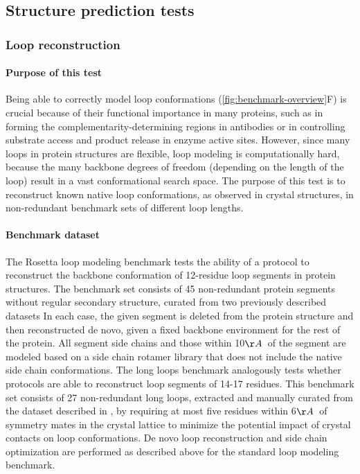 \subsection{Structure prediction tests}

\subsubsection{Loop reconstruction}

\paragraph{Purpose of this test}
Being able to correctly model loop conformations (\cref{fig:benchmark-overview}F) is crucial because of their functional importance in many proteins, such as in forming the complementarity-determining regions in antibodies or in controlling substrate access and product release in enzyme active sites. However, since many loops in protein structures are flexible, loop modeling is computationally hard, because the many backbone degrees of freedom (depending on the length of the loop) result in a vast conformational search space. The purpose of this test is to reconstruct known native loop conformations, as observed in crystal structures, in non-redundant benchmark sets of different loop lengths.

\paragraph{Benchmark dataset}
The Rosetta loop modeling benchmark \cite{mandell_sub-angstrom_2009,tonikian_specificity_2008,ernst_rapid_2009,smith_predicting_2011,smith_structure-based_2010,stein_improvements_2013} tests the ability of a protocol to reconstruct the backbone conformation of 12-residue loop segments in protein structures. The benchmark set consists of 45 non-redundant protein segments without regular secondary structure, curated from two previously described datasets \cite{sellers_toward_2008,wang_proteinprotein_2007,fiser_modeling_2000,rohl_modeling_2004,zhu_long_2006,jacobson_hierarchical_2004}
In each case, the given segment is deleted from the protein structure and then reconstructed de novo, given a fixed backbone environment for the rest of the protein. All segment side chains and those within 10$\AA$\ of the segment are modeled based on a side chain rotamer library \cite{shapovalov_smoothed_2011} that does not include the native side chain conformations.
The long loops benchmark \cite{stein_improvements_2013} analogously tests whether protocols are able to reconstruct loop segments of 14-17 residues. This benchmark set consists of 27 non-redundant long loops, extracted and manually curated from the dataset described in \cite{zhao_progress_2011}, by requiring at most five residues within 6$\AA$\ of symmetry mates in the crystal lattice to minimize the potential impact of crystal contacts on loop conformations. De novo loop reconstruction and side chain optimization are performed as described above for the standard loop modeling benchmark.

